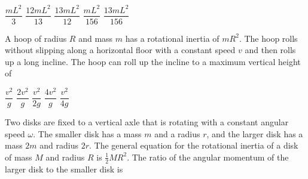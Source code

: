 \documentclass{../../../oss-ap12ibhl-print}
\begin{document}
\begin{questions}
  \begin{minipage}{.4\linewidth}
  \end{minipage}
  \begin{minipage}{.2\linewidth}
    \begin{choices}
      \choice$\dfrac{mL^2}{3}$
      \choice$\dfrac{12mL^2}{13}$
      \choice$\dfrac{13mL^2}{12}$
      \choice$\dfrac{mL^2}{156}$
      \choice$\dfrac{13mL^2}{156}$
    \end{choices}
  \end{minipage}

  \question A hoop of radius $R$ and mass $m$ has a rotational inertia of
  $mR^2$. The hoop rolls without slipping along a horizontal floor with a
  constant speed $v$ and then rolls up a long incline. The hoop can roll up the
  incline to a maximum vertical height of

  \begin{minipage}{.5\linewidth}
  \end{minipage}
  \begin{minipage}{.2\linewidth}
    \begin{choices}
      \choice$\dfrac{v^2}{g}$
      \choice$\dfrac{2v^2}{g}$
      \choice$\dfrac{v^2}{2g}$
      \choice$\dfrac{4v^2}{g}$
      \choice$\dfrac{v^2}{4g}$
    \end{choices}
  \end{minipage}
  \newpage
  
  \question Two disks are fixed to a vertical axle that is rotating with a
  constant angular speed $\omega$. The smaller disk has a mass $m$ and a radius
  $r$, and the larger disk has a mass $2m$ and radius $2r$. The general equation
  for the rotational inertia of a disk of mass $M$ and radius $R$ is
  $\frac12MR^2$. The ratio of the angular momentum of the larger disk to
  the smaller disk is


\end{questions}
\end{document}
